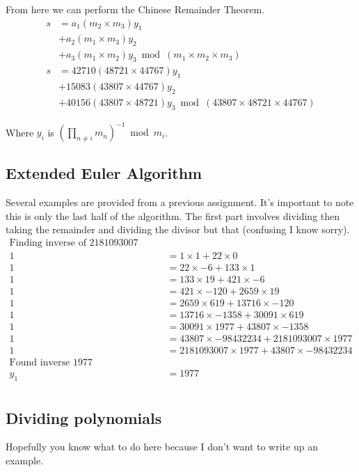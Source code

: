 \documentclass{report}
\begin{document}
From here we can perform the Chinese Remainder Theorem.
\begin{align*}
    s &= a_1 (m_2 \times m_3) y_1 \\
      &+ a_2 (m_1 \times m_3) y_2 \\
      &+ a_3 (m_1 \times m_2) y_3 \bmod (m_1 \times m_2 \times m_3) \\
    s &= 42710 (48721 \times 44767) y_1 \\
      &+ 15083 (43807 \times 44767) y_2 \\
      &+ 40156 (43807 \times 48721) y_3 \bmod (43807 \times 48721 \times 44767)
\end{align*}

Where $y_i$ is ${(\prod_{n \neq i} m_n)}^{-1} \bmod m_i$.

\subsection{Extended Euler Algorithm}
Several examples are provided from a previous assignment.
It's important to note this is only the last half of the algorithm.
The first part involves dividing then taking the remainder and dividing the
divisor but that (confusing I know sorry).
\begin{align*}
    \text{Finding inverse of 2181093007 mod 43807} \\
    1 &= 1 \times 1 + 22 \times 0 \\
    1 &= 22 \times -6 + 133 \times 1 \\
    1 &= 133 \times 19 + 421 \times -6 \\
    1 &= 421 \times -120 + 2659 \times 19 \\
    1 &= 2659 \times 619 + 13716 \times -120 \\
    1 &= 13716 \times -1358 + 30091 \times 619 \\
    1 &= 30091 \times 1977 + 43807 \times -1358 \\
    1 &= 43807 \times -98432234 + 2181093007 \times 1977 \\
    1 &= 2181093007 \times 1977 + 43807 \times -98432234 \\
    \text{Found inverse 1977} \\
    y_1 &= 1977 \\
\end{align*}

\subsection{Dividing polynomials}
Hopefully you know what to do here because I don't want to write up an
example.
\end{document}
